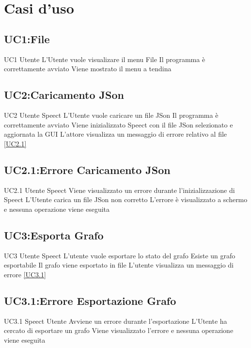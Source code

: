 \documentclass[../AnalisideiRequisiti.tex]{subfiles}
\begin{document}
	\chapter{Casi d'uso}
	\section{UC1:File}
	\UserCase
	{UC1}
	{Utente}
	{}
	{L'Utente vuole visualizare il menu File}
	{Il programma è correttamente avviato}
	{Viene mostrato il menu a tendina}
	{}
	{}
	\section{UC2:Caricamento JSon}
	\UserCase
	{UC2}
	{Utente}
	{Speect}
	{L'Utente vuole caricare un file JSon}
	{Il programma è correttamente avviato}
	{Viene inizializzato Speect con il file JSon selezionato e aggiornata la GUI}
	{L'attore visualizza un messaggio di errore relativo al file \ref{UC2.1}}
	{}
	\section{UC2.1:Errore Caricamento JSon}
	\UserCase
	{UC2.1}
	{Utente}
	{Speect}
	{Viene visualizzato un errore durante l'inizializzazione di Speect}
	{L'Utente carica un file JSon non corretto}
	{L'errore è visualizzato a schermo e nessuna operazione viene eseguita}
	{}
	{}
	\section{UC3:Esporta Grafo}
	\UserCase
	{UC3}
	{Utente}
	{Speect}
	{L'utente vuole esportare lo stato del grafo}
	{Esiste un grafo esportabile}
	{Il grafo viene esportato in file}
	{ L'utente visualizza un messaggio di errore \ref{UC3.1}}
	{}
\section{UC3.1:Errore Esportazione Grafo}
\UserCase
{UC3.1}
{Speect}
{Utente}
{Avviene un errore durante l'esportazione}
{L'Utente ha cercato di esportare un grafo}
{Viene visualizzato l'errore e nessuna operazione viene eseguita}
{}
{}
\end{document}
